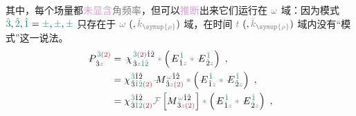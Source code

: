 其中，每个场量都\textcolor{Plum}{未显含}\textcolor{gray}{角频率}，但可以\textcolor{Plum}{推断}出来它们运行在 $\mathcolor{gray}{\omega}$ 域：因为\textcolor{PineGreen}{模式} $\textcolor{PineGreen}{\hat{3}},\textcolor{PineGreen}{\hat{2}},\textcolor{PineGreen}{\hat{1}} = \textcolor{PineGreen}{\pm},\textcolor{PineGreen}{\pm},\textcolor{PineGreen}{\pm}$ 只存在于 $\mathcolor{gray}{\omega}~ (, \mathcolor{gray}{\bar{k}_{\symup{\rho}}})$ 域，在时间 $\mathcolor{gray}{t}~ (, \mathcolor{gray}{\bar{k}_{\symup{\rho}}})$ 域内没有“\textcolor{PineGreen}{模式}”这一说法。
\begin{subequations} \label{eq:DP^(2)-3_12-C}
\begin{align}
	\Xint{\mathcolor{gray}{-}}{30}{P}^{\;\! \textcolor{PineGreen}{\hat{3}} \textcolor{Maroon}{(2)} }_{\;\! \hat{3}\mathcolor{gray}{z}} &= \Xint{{}^{}_{\mathcolor{gray}{-}}}{23}{\chi}^{\;\! \textcolor{PineGreen}{\hat{3}} \textcolor{Maroon}{(2)} \hat{1} \hat{2} }_{\;\! \hat{3} \mathcolor{gray}{z} \textcolor{PineGreen}{\hat{1} \hat{2}}} \mathcolor{gray}{*} \left( \Xint{\mathcolor{gray}{-}}{295}{E}^{\;\!\textcolor{PineGreen}{\hat{1}}}_{\;\! \hat{1} \mathcolor{gray}{z}} \mathcolor{gray}{*} \Xint{\mathcolor{gray}{-}}{295}{E}^{\;\!\textcolor{PineGreen}{\hat{1}}}_{\;\! \hat{2} \mathcolor{gray}{z}} \right) ~, \label{eq:DP^(2)-3_12-C1} \\
	&= {\chi}^{\;\! \textcolor{PineGreen}{\hat{3}} \hat{1} \hat{2} }_{\;\! \hat{3} \textcolor{PineGreen}{\hat{1} \hat{2}} \textcolor{Maroon}{(2)}} \Xint{\mathcolor{gray}{-}}{18}{M}^{\;\! \mathcolor{gray}{\omega} \hat{1} \hat{2} }_{\;\! \hat{3} \mathcolor{gray}{z} \textcolor{Maroon}{(2)} } \mathcolor{gray}{*} \left( \Xint{\mathcolor{gray}{-}}{295}{E}^{\;\!\textcolor{PineGreen}{\hat{1}}}_{\;\! \hat{1} \mathcolor{gray}{z}} \mathcolor{gray}{*} \Xint{\mathcolor{gray}{-}}{295}{E}^{\;\!\textcolor{PineGreen}{\hat{1}}}_{\;\! \hat{2} \mathcolor{gray}{z}} \right) ~, \label{eq:DP^(2)-3_12-C2} \\
	&= {\chi}^{\;\! \textcolor{PineGreen}{\hat{3}} \hat{1} \hat{2} }_{\;\! \hat{3} \textcolor{PineGreen}{\hat{1} \hat{2}} \textcolor{Maroon}{(2)}} \mathcolor{gray}{\mathcal F} \left[ M^{\;\! \mathcolor{gray}{\omega} \hat{1} \hat{2} }_{\;\! \hat{3} \mathcolor{gray}{z} \textcolor{Maroon}{(2)} } \right] \mathcolor{gray}{*} \left( \Xint{\mathcolor{gray}{-}}{295}{E}^{\;\!\textcolor{PineGreen}{\hat{1}}}_{\;\! \hat{1} \mathcolor{gray}{z}} \mathcolor{gray}{*} \Xint{\mathcolor{gray}{-}}{295}{E}^{\;\!\textcolor{PineGreen}{\hat{1}}}_{\;\! \hat{2} \mathcolor{gray}{z}} \right) ~, \label{eq:DP^(2)-3_12-C3} \\

\end{align}
\end{subequations}
